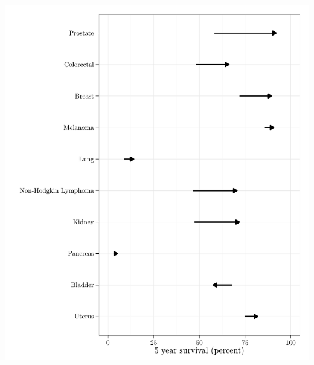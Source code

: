 \documentclass{article}\usepackage[]{graphicx}\usepackage[]{color}
\makeatletter
\def\maxwidth{ %
  \ifdim\Gin@nat@width>\linewidth
    \linewidth
  \else
    \Gin@nat@width
  \fi
}
\newenvironment{knitrout}{}{} %
\makeatother
\begin{document}
\begin{knitrout}
{\centering \includegraphics[width=\maxwidth]{figure/historical-survival-all-2} 

}



\end{knitrout}
\end{document}
